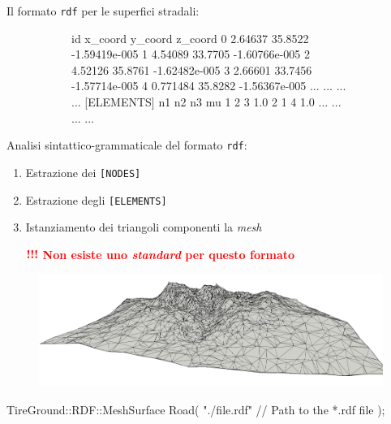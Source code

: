 \documentclass[xcolor=dvipsnames]{beamer} %
\begin{document}
\begin{frame}[fragile]
	\Large {Il formato \texttt{rdf}} per le superfici stradali:
	\normalsize
	\begin{figure}
		\centering
		\begin{subfigure}{.5\linewidth}
\begin{pseudoc}
[NODES]
{ id x_coord y_coord z_coord }
0 2.64637 35.8522 -1.59419e-005 
1 4.54089 33.7705 -1.60766e-005 
2 4.52126 35.8761 -1.62482e-005 
3 2.66601 33.7456 -1.57714e-005 
4 0.771484 35.8282 -1.56367e-005 
... ... ... ...
[ELEMENTS]
{ n1 n2 n3 mu }
1 2 3 1.0 
2 1 4 1.0 
... ... ... ...
\end{pseudoc}
		\end{subfigure}
	\end{figure}
\end{frame}

\begin{frame}[fragile]
	\Large{Analisi sintattico-grammaticale del formato \texttt{rdf}}:
	\normalsize
	\begin{enumerate}
		\item Estrazione dei \texttt{[NODES]}
		\item Estrazione degli \texttt{[ELEMENTS]}
		\item Istanziamento dei triangoli componenti la \textit{mesh}
		\item[$\textcolor{red}{\textbf{!!!}}$] \textcolor{red}{\textbf{ Non esiste uno \textit{standard} per questo formato}}
	\end{enumerate}
\begin{figure}
	\centering
	\includegraphics[width=0.7\linewidth]{../Figures/mesh}
\end{figure}
\vspace{-0.3cm}
\begin{pseudoc}
TireGround::RDF::MeshSurface Road(
"./file.rdf" // Path to the *.rdf file
);
\end{pseudoc}
\end{frame}
\end{document}
